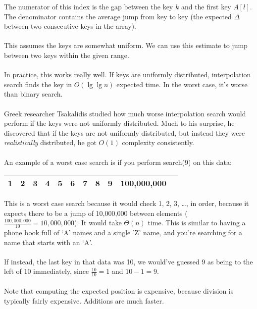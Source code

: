 \documentclass[]{article}
\theoremstyle{definition}
\newcommand{\lecture}[1]{\marginpar{{\footnotesize $\leftarrow$ \underline{#1}}}}
\begin{document}
			The numerator of this index is the gap between the key $k$ and the first key $A[l]$. The denominator contains the average jump from key to key (the expected $\Delta$ between two consecutive keys in the array).
			\\ \\
			This assumes the keys are somewhat uniform. We can use this estimate to jump between two keys within the given range.
			\\ \\
			In practice, this works really well. If keys are uniformly distributed, interpolation search finds the key in $O(\lg \lg n)$ expected time. In the worst case, it's worse than binary search.
			\\ \\
			Greek researcher Tsakalidis studied how much worse interpolation search would perform if the keys were not uniformly distributed. Much to his surprise, he discovered that if the keys are not uniformly distributed, but instead they were \emph{realistically} distributed, he got $O(1)$ complexity consistently. 
			\\ \\
			\lecture{March 7, 2013} An example of a worst case search is if you perform search(9) on this data: 
			\begin{center}
				\begin{tabular}{|c|c|c|c|c|c|c|c|c|c|c|}
					\hline
					1 & 2 & 3 & 4 & 5 & 6 & 7 & 8 & 9 & 100,000,000 \\ \hline
				\end{tabular}
			\end{center}
			This is a worst case search because it would check 1, 2, 3, \ldots, in order, because it expects there to be a jump of 10,000,000 between elements ($\frac{100,000,000}{10} = 10,000,000$). It would take $\Theta(n)$ time. This is similar to having a phone book full of `A' names and a single 'Z' name, and you're searching for a name that starts with an `A'.
			\\ \\
			If instead, the last key in that data was 10, we would've guessed 9 as being to the left of 10 immediately, since $\frac{10}{10} = 1$ and $10 - 1 = 9$.
			\\ \\
			Note that computing the expected position is expensive, because division is typically fairly expensive. Additions are much faster.
\end{document}
